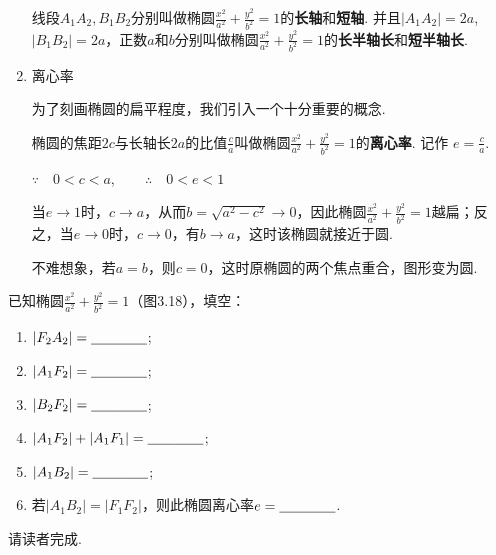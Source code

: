\begin{enumerate}
线段$A_1A_2, B_1B_2$分别叫做椭圆$\frac{x^2}{a^2}+\frac{y^2}{b^2}=1$的\textbf{长轴}和\textbf{短轴}. 并且$|A_1A_2|=2a$, $|B_1B_2|=2a$，正数$a$和$b$分别叫做椭圆$\frac{x^2}{a^2}+\frac{y^2}{b^2}=1$的\textbf{长半轴长}和\textbf{短半轴长}.

\item 离心率

为了刻画椭圆的扁平程度，我们引入一个十分重要的概念.

椭圆的焦距$2c$与长轴长$2a$的比值$\frac{c}{a}$叫做椭圆$\frac{x^2}{a^2}+\frac{y^2}{b^2}=1$的\textbf{离心率}. 记作
$e=\frac{c}{a}$.

$\because\quad 0<c<a,\qquad \therefore\quad 0<e<1$

当$e\to 1$时，$c\to a$，从而$b=\sqrt{a^2-c^2}\to 0$，因此椭圆$\frac{x^2}{a^2}+\frac{y^2}{b^2}=1$越扁；反之，当$e\to 0$时，$c\to 0$，有$b\to a$，这时该椭圆就接近于圆.

不难想象，若$a=b$，则$c=0$，这时原椭圆的两个焦点重合，图形变为圆.
\end{enumerate}

\begin{example}
已知椭圆$\frac{x^2}{a^2}+\frac{y^2}{b^2}=1$（图3.18），填空：
\begin{multicols}{2}
\begin{enumerate}[(1)]
    \item $|F_2A_2|=\underline{\qquad}\underline{\qquad}$;
    \item $|A_1F_2|=\underline{\qquad}\underline{\qquad}$;
    \item $|B_2F_2|=\underline{\qquad}\underline{\qquad}$;
    \item $|A_1F_2|+|A_1F_1|=\underline{\qquad}\underline{\qquad}$;
    \item $|A_1B_2|=\underline{\qquad}\underline{\qquad}$;
    \item 若$|A_1B_2|=|F_1F_2|$，则此椭圆离心率$e=\underline{\qquad}\underline{\qquad}$.
\end{enumerate}    
\end{multicols}

请读者完成.
\end{example}


